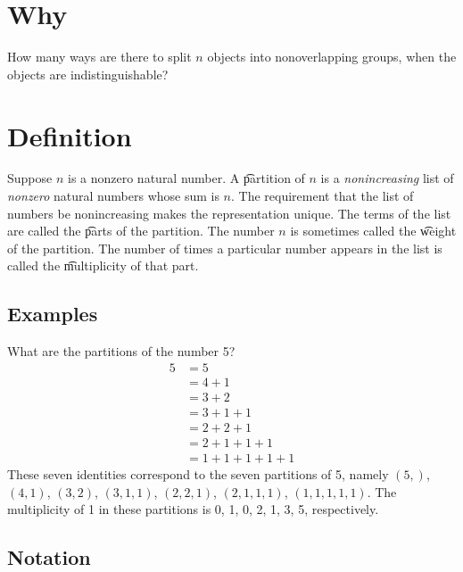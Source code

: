 

\section*{Why}

How many ways are there to split $n$ objects into nonoverlapping groups, when the objects are indistinguishable?

\section*{Definition}

Suppose $n$ is a nonzero natural number.
A \t{partition} of $n$ is a \textit{nonincreasing} list of \textit{nonzero} natural numbers whose sum is $n$.
The requirement that the list of numbers be nonincreasing makes the representation unique.
The terms of the list are called the \t{parts} of the partition.
The number $n$ is sometimes called the \t{weight} of the partition.
The number of times a particular number appears in the list is called the \t{multiplicity} of that part.

\subsection*{Examples}

What are the partitions of the number 5?
\[
\begin{aligned}
5
&= 5 \\
&= 4 + 1 \\
&= 3 + 2 \\
&= 3 + 1 + 1 \\
&= 2 + 2 + 1 \\
&= 2 + 1 + 1 + 1 \\
&= 1 + 1 + 1 + 1 + 1
\end{aligned}
\]
These seven identities correspond to the seven partitions of 5, namely $(5,)$, $(4, 1)$, $(3, 2)$, $(3,1,1)$, $(2,2,1)$, $(2,1,1,1)$, $(1,1,1,1,1)$.
The multiplicity of 1 in these partitions is 0, 1, 0, 2, 1, 3, 5, respectively.

\subsection*{Notation}

